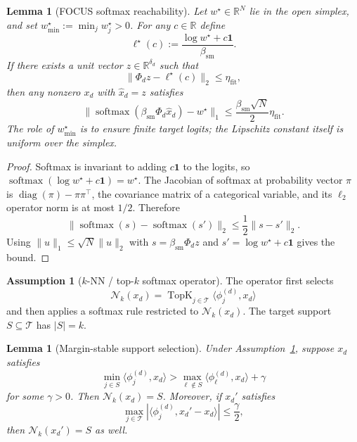\documentclass{article}
\theoremstyle{plain}
\newtheorem{lemma}[theorem]{Lemma}
\theoremstyle{definition}
\newtheorem{assumption}[theorem]{Assumption}
\theoremstyle{remark}
\begin{document}
\begin{lemma}[FOCUS softmax reachability]
\label{lem:softmax-reachability}
Let $w^\star\in\mathbb{R}^{N}$ lie in the open simplex, and set $w^\star_{\min}:=\min_j w^\star_j>0$. For any $c\in\mathbb{R}$ define
\[
\ell^\star(c):=\frac{\log w^\star+c\mathbf{1}}{\beta_{\mathrm{sm}}}.
\]
If there exists a unit vector $z\in\mathbb{R}^{\delta_d}$ such that
\[
\|\Phi_d z-\ell^\star(c)\|_2\le \eta_{\mathrm{fit}},
\]
then any nonzero $x_d$ with $\widehat{x}_d=z$ satisfies
\[
\|\operatorname{softmax}(\beta_{\mathrm{sm}}\Phi_d\widehat{x}_d)-w^\star\|_1
\le
\frac{\beta_{\mathrm{sm}}\sqrt{N}}{2}\eta_{\mathrm{fit}}.
\]
The role of $w^\star_{\min}$ is to ensure finite target logits; the Lipschitz constant itself is uniform over the simplex.
\end{lemma}

\begin{proof}
Softmax is invariant to adding $c\mathbf{1}$ to the logits, so $\operatorname{softmax}(\log w^\star+c\mathbf{1})=w^\star$. The Jacobian of softmax at probability vector $\pi$ is $\operatorname{diag}(\pi)-\pi\pi^\top$, the covariance matrix of a categorical variable, and its $\ell_2$ operator norm is at most $1/2$. Therefore
\[
\|\operatorname{softmax}(s)-\operatorname{softmax}(s')\|_2
\le
\frac{1}{2}\|s-s'\|_2.
\]
Using $\|u\|_1\le\sqrt{N}\|u\|_2$ with $s=\beta_{\mathrm{sm}}\Phi_d z$ and $s'=\log w^\star+c\mathbf{1}$ gives the bound.
\end{proof}

\begin{assumption}[$k$-NN / top-$k$ softmax operator]
\label{ass:knn-topk-operator}
The operator first selects
\[
\mathcal{N}_k(x_d)=\operatorname{TopK}_{j\in\mathcal{T}}\langle \phi_j^{(d)},x_d\rangle
\]
and then applies a softmax rule restricted to $\mathcal{N}_k(x_d)$. The target support $S\subseteq\mathcal{T}$ has $|S|=k$.
\end{assumption}

\begin{lemma}[Margin-stable support selection]
\label{lem:margin-stable-knn}
Under Assumption~\ref{ass:knn-topk-operator}, suppose $x_d$ satisfies
\[
\min_{j\in S}\langle \phi_j^{(d)},x_d\rangle
>
\max_{\ell\notin S}\langle \phi_\ell^{(d)},x_d\rangle+\gamma
\]
for some $\gamma>0$. Then $\mathcal{N}_k(x_d)=S$. Moreover, if $x_d'$ satisfies
\[
\max_{j\in\mathcal{T}}
|\langle \phi_j^{(d)},x_d'-x_d\rangle|
\le
\frac{\gamma}{2},
\]
then $\mathcal{N}_k(x_d')=S$ as well.
\end{lemma}
\end{document}

